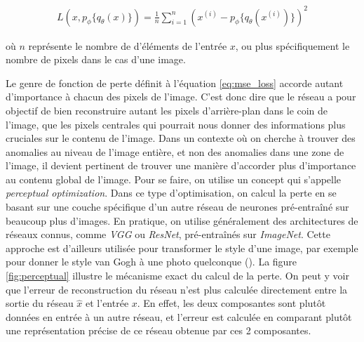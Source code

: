 \begin{gather} \label{eq:mse_loss}
L(x, p_\phi\{q_\theta(x)\}) = \frac{1}{n} \sum_{i=1}^{n} (x^{(i)} - p_\phi\{q_\theta(x^{(i)})\})^2
\end{gather}

où $n$ représente le nombre de d'éléments de l'entrée $x$, ou plus spécifiquement le nombre de pixels dans le cas d'une image.

Le genre de fonction de perte définit à l'équation \ref{eq:mse_loss} accorde autant d'importance à chacun des pixels de l'image. C'est donc dire que le réseau a pour objectif de bien reconstruire autant les pixels d'arrière-plan dans le coin de l'image, que les pixels centrales qui pourrait nous donner des informations plus cruciales sur le contenu de l'image. Dans un contexte où on cherche à trouver des anomalies au niveau de l'image entière, et non des anomalies dans une zone de l'image, il devient pertinent de trouver une manière d'accorder plus d'importance au contenu global de l'image. Pour se faire, on utilise un concept qui s'appelle \textit{perceptual optimization}. Dans ce type d'optimisation, on calcul la perte en se basant sur une couche spécifique d'un autre réseau de neurones pré-entraîné sur beaucoup plus d'images. En pratique, on utilise généralement des architectures de réseaux connus,  comme \textit{VGG} ou \textit{ResNet}, pré-entraînés sur \textit{ImageNet}. Cette approche est d'ailleurs utilisée pour transformer le style d'une image, par exemple pour donner le style van Gogh à une photo quelconque (\cite{Johnson2016Perceptual}). La figure \ref{fig:perceptual} illustre le mécanisme exact du calcul de la perte. On peut y voir que l'erreur de reconstruction du réseau n'est plus calculée directement entre la sortie du réseau $\hat{x}$ et l'entrée $x$. En effet, les deux composantes sont plutôt données en entrée à un autre réseau, et l'erreur est calculée en comparant plutôt une représentation précise de ce réseau obtenue par ces 2 composantes.

